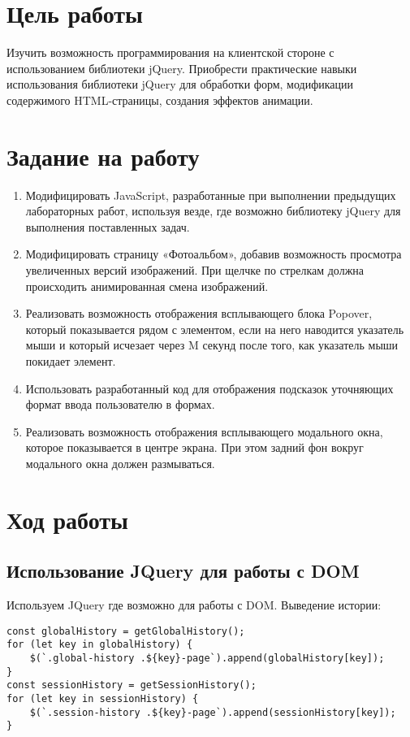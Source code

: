 \documentclass[a4paper,14pt]{extarticle}
\begin{document}


\section{Цель работы}
Изучить возможность программирования на клиентской стороне с
использованием библиотеки jQuery. Приобрести практические навыки использования
библиотеки jQuery для обработки форм, модификации содержимого HTML-страницы,
создания эффектов анимации.

\section{Задание на работу}
\begin{enumerate}
    \item Модифицировать JavaScript, разработанные при выполнении
          предыдущих лабораторных работ, используя везде, где возможно библиотеку
          jQuery для выполнения поставленных задач.
    \item Модифицировать страницу «Фотоальбом», добавив возможность
          просмотра увеличенных версий изображений. При щелчке по стрелкам
          должна происходить анимированная смена изображений.
    \item Реализовать возможность отображения всплывающего блока Popover,
          который показывается рядом с элементом, если на него наводится
          указатель мыши и который исчезает через M секунд после того,
          как указатель мыши покидает элемент.
    \item Использовать разработанный код для отображения подсказок уточняющих
          формат ввода пользователю в формах.
    \item Реализовать возможность отображения всплывающего модального окна,
          которое показывается в центре экрана. При этом задний фон вокруг
          модального окна должен размываться.
\end{enumerate}

\section{Ход работы}
\subsection{Использование JQuery для работы с DOM}
Используем JQuery где возможно для работы с DOM. Выведение истории:
\begin{lstlisting}
const globalHistory = getGlobalHistory();
for (let key in globalHistory) {
    $(`.global-history .${key}-page`).append(globalHistory[key]);
}
const sessionHistory = getSessionHistory();
for (let key in sessionHistory) {
    $(`.session-history .${key}-page`).append(sessionHistory[key]);
}
\end{lstlisting}
\end{document}
